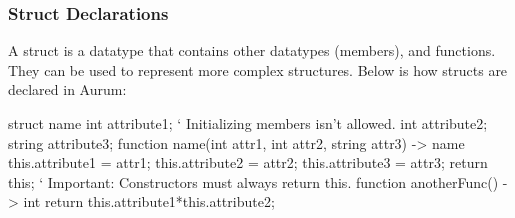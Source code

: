 \documentclass[12pt, letterpaper, oneside]{article}
\begin{document}
	\subsubsection{Struct Declarations}
	A struct is a datatype that contains other datatypes (members), and \newline functions. They can be used to represent more complex structures. Below is how structs are declared in Aurum:
	\begin{spverbatim}
		struct name {
			int attribute1; ` Initializing members isn't allowed.
			int attribute2;
			string attribute3;
			function name(int attr1, int attr2, string attr3) -> name {
				this.attribute1 = attr1;
				this.attribute2 = attr2;
				this.attribute3 = attr3;
				return this; ` Important: Constructors must always return this.
			}
			function anotherFunc() -> int {
				return this.attribute1*this.attribute2;
			}
		}
	\end{spverbatim}
\end{document}
